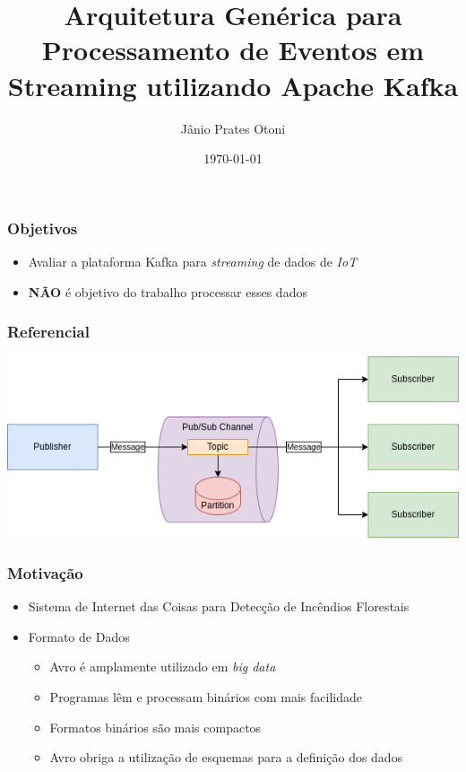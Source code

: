 \documentclass[hyperref={bookmarks=false},aspectratio=169]{beamer}
\title{Arquitetura Genérica para Processamento de Eventos em Streaming utilizando Apache Kafka}
\author{Jânio Prates Otoni}
\date{\today}
\begin{document}
\begin{frame}
\titlepage
\end{frame}


\begin{frame}
\frametitle{Objetivos}
\begin{itemize}
    \item Avaliar a plataforma Kafka para \textit{streaming} de dados de \textit{IoT}
    \item \textbf{NÃO} é objetivo do trabalho processar esses dados
\end{itemize}
\end{frame}

\begin{frame}
\frametitle{Referencial}
\includegraphics[scale=0.65]{imagens/pubsub.png}
\end{frame}

\begin{frame}
\frametitle{Motivação}
\begin{itemize}
    \item Sistema de Internet das Coisas para Detecção de Incêndios Florestais
    \item Formato de Dados
    \begin{itemize}
        \item Avro é amplamente utilizado em \textit{big data}
        \item Programas lêm e processam binários com mais facilidade
        \item Formatos binários são mais compactos
        \item Avro obriga a utilização de esquemas para a definição dos dados
    \end{itemize}
\end{itemize}
\end{frame}
\end{document}
